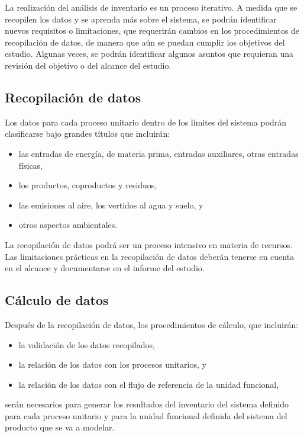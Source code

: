 La realización del análisis de inventario es un proceso iterativo. A medida que se recopilen los datos y se aprenda más sobre el sistema, se podrán identificar nuevos requisitos o limitaciones, que requerirán cambios en los procedimientos de recopilación de datos, de manera que aún se puedan cumplir los objetivos del estudio. Algunas veces, se podrán identificar algunos asuntos que requieran una revisión del objetivo o del alcance del estudio.

\subsection{Recopilación de datos}

Los datos para cada proceso unitario dentro de los límites del sistema podrán clasificarse bajo grandes títulos que incluirán:
\begin{itemize}
  \item las entradas de energía, de materia prima, entradas auxiliares, otras entradas físicas,
  \item los productos, coproductos y residuos,
  \item las emisiones al aire, los vertidos al agua y suelo, y
  \item otros aspectos ambientales.
\end{itemize}

La recopilación de datos podrá ser un proceso intensivo en materia de recursos. Las limitaciones prácticas en la recopilación de datos deberán tenerse en cuenta en el alcance y documentarse en el informe del estudio.

\subsection{Cálculo de datos}
Después de la recopilación de datos, los procedimientos de cálculo, que incluirán:
\begin{itemize}
  \item la validación de los datos recopilados,
  \item la relación de los datos con los procesos unitarios, y
  \item la relación de los datos con el flujo de referencia de la unidad funcional,
\end{itemize}

serán necesarios para generar los resultados del inventario del sistema definido para cada proceso unitario y para la unidad funcional definida del sistema del producto que se va a modelar.

